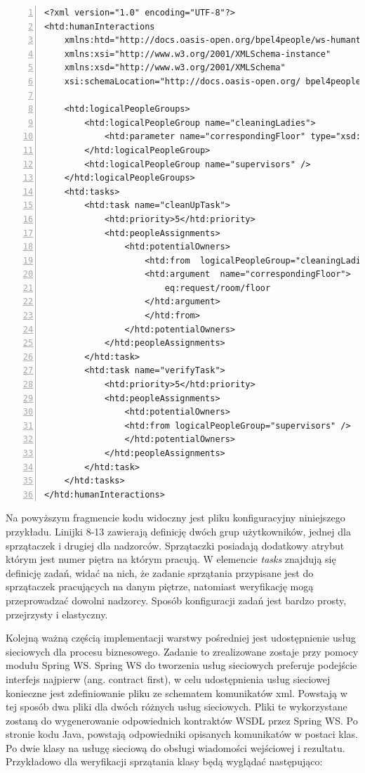 \begin{lstlisting}[caption=Plik konfiguracyjny z opisem zadań warstwy pośredniej.,numbers=left]
<?xml version="1.0" encoding="UTF-8"?>
<htd:humanInteractions
	xmlns:htd="http://docs.oasis-open.org/bpel4people/ws-humantask"
	xmlns:xsi="http://www.w3.org/2001/XMLSchema-instance"
	xmlns:xsd="http://www.w3.org/2001/XMLSchema"
	xsi:schemaLocation="http://docs.oasis-open.org/ bpel4people/ws-humantask  http://docs.oasis-open.org/bpel4people/ws-humantask.xsd">

	<htd:logicalPeopleGroups>
		<htd:logicalPeopleGroup name="cleaningLadies">
			<htd:parameter name="correspondingFloor" type="xsd:int"/>
		</htd:logicalPeopleGroup>
		<htd:logicalPeopleGroup name="supervisors" />
	</htd:logicalPeopleGroups>
	<htd:tasks>
		<htd:task name="cleanUpTask">
			<htd:priority>5</htd:priority>
			<htd:peopleAssignments>
				<htd:potentialOwners>
					<htd:from  logicalPeopleGroup="cleaningLadies">
					<htd:argument  name="correspondingFloor">
						eq:request/room/floor
					</htd:argument>
					</htd:from>
				</htd:potentialOwners>
			</htd:peopleAssignments>
		</htd:task>
		<htd:task name="verifyTask">
			<htd:priority>5</htd:priority>
			<htd:peopleAssignments>
				<htd:potentialOwners>
				<htd:from logicalPeopleGroup="supervisors" />
				</htd:potentialOwners>
			</htd:peopleAssignments>
		</htd:task>
	</htd:tasks>
</htd:humanInteractions>
\end{lstlisting}

Na powyższym fragmencie kodu widoczny jest pliku konfiguracyjny niniejszego przykładu. Linijki 8-13 zawierają definicję dwóch grup użytkowników, jednej dla sprzątaczek i drugiej dla nadzorców. Sprzątaczki posiadają dodatkowy atrybut którym jest numer piętra na którym pracują. W elemencie \textit{tasks} znajdują się definicję zadań, widać na nich, że zadanie sprzątania przypisane jest do sprzątaczek pracujących na danym piętrze, natomiast weryfikację mogą przeprowadzać dowolni nadzorcy. Sposób konfiguracji zadań jest bardzo prosty, przejrzysty i elastyczny. 

Kolejną ważną częścią implementacji warstwy pośredniej jest udostępnienie usług sieciowych dla procesu biznesowego. Zadanie to zrealizowane zostaje przy pomocy modułu Spring WS. Spring WS do tworzenia usług sieciowych preferuje podejście interfejs najpierw (ang. contract first), w celu udostępnienia usług sieciowej konieczne jest zdefiniowanie pliku ze schematem komunikatów xml. Powstają w tej sposób dwa pliki dla dwóch różnych usług sieciowych. Pliki te wykorzystane zostaną do wygenerowanie odpowiednich kontraktów WSDL przez Spring WS. Po stronie kodu Java, powstają odpowiedniki opisanych komunikatów w postaci klas. Po dwie klasy na usługę sieciową do obsługi wiadomości wejściowej i rezultatu. Przykładowo dla weryfikacji sprzątania klasy będą wyglądać następująco: 

